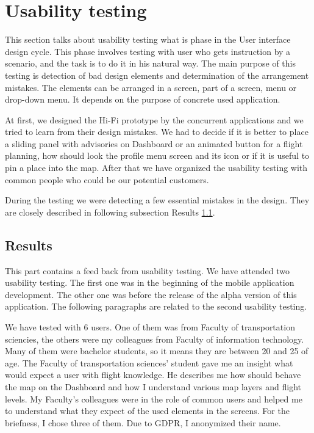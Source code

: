 \section{Usability testing}\label{sec:usability-testing}

This section talks about usability testing what is phase in the User interface design cycle.
This phase involves testing with user who gets instruction by a scenario, and the task is to do it in his natural way.
The main purpose of this testing is detection of bad design elements and determination of the arrangement mistakes.
The elements can be arranged in a screen, part of a screen, menu or drop-down menu.
It depends on the purpose of concrete used application.

At first, we designed the Hi-Fi prototype by the concurrent applications and we tried to learn from their design mistakes.
We had to decide if it is better to place a sliding panel with advisories on Dashboard or an animated button for a flight planning, how should look the profile menu screen and its icon or if it is useful to pin a place into the map.
After that we have organized the usability testing with common people who could be our potential customers.

During the testing we were detecting a few essential mistakes in the design.
They are closely described in following subsection Results \ref{subsec:results}.

\subsection{Results}\label{subsec:results}
This part contains a feed back from usability testing.
We have attended two usability testing.
The first one was in the beginning of the mobile application development.
The other one was before the release of the alpha version of this application.
The following paragraphs are related to the second usability testing.

We have tested with 6 users.
One of them was from Faculty of transportation sciencies, the others were my colleagues from Faculty of information technology.
Many of them were bachelor students, so it means they are between 20 and 25 of age.
The Faculty of transportation sciences' student gave me an insight what would expect a user with flight knowledge.
He describes me how should behave the map on the Dashboard and how I understand various map layers and flight levels.
My Faculty's colleagues were in the role of common users and helped me to understand what they expect of the used elements in the screens.
For the briefness, I chose three of them.
Due to GDPR, I anonymized their name.

